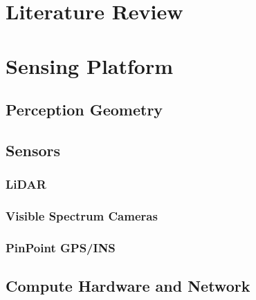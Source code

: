 \documentclass{erauthesis}
\begin{document}
\chapter{Literature Review} \label{litReview}
% 


\chapter{Sensing Platform} \label{sensing_platform}


\section{Perception Geometry} \label{perception_geometry}


\section{Sensors} \label{sensors}
% 

\subsection{LiDAR} \label{sensors_LiDAR}


\subsection{Visible Spectrum Cameras} \label{visual_cameras}


\subsection{PinPoint GPS/INS} \label{sensors_GPS}


\section{Compute Hardware and Network} \label{sec:Atlas_LAN}

\end{document}
